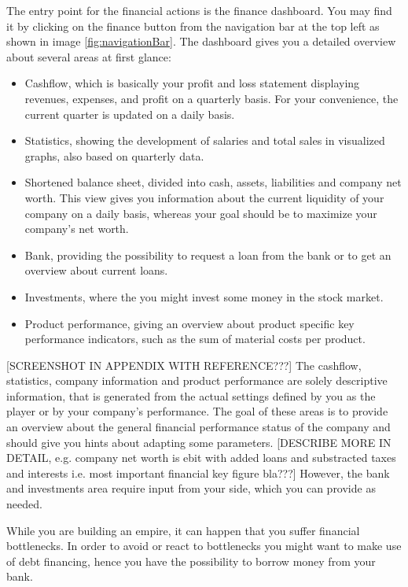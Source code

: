  The entry point for the financial actions is the finance dashboard. You may find it by clicking on the finance button from the navigation bar at the top left as shown in image \ref{fig:navigationBar}. The dashboard gives you a detailed overview about several areas at first glance:
\begin{itemize}
    \item Cashflow, which is basically your profit and loss statement displaying revenues, expenses, and profit on a quarterly basis. For your convenience, the current quarter is updated on a daily basis.
    \item Statistics, showing the development of salaries and total sales in visualized graphs, also based on quarterly data.
    \item Shortened balance sheet, divided into cash, assets, liabilities and company net worth. This view gives you information about the current liquidity of your company on a daily basis, whereas your goal should be to maximize your company's net worth.
    \item Bank, providing the possibility to request a loan from the bank or to get an overview about current loans.
    \item Investments, where the you might invest some money in the stock market.
    \item Product performance, giving an overview about product specific key performance indicators, such as the sum of material costs per product.
\end{itemize}
[SCREENSHOT IN APPENDIX WITH REFERENCE???] The cashflow, statistics, company information and product performance are solely descriptive information, that is generated from the actual settings defined by you as the player or by your company’s performance. The goal of these areas is to provide an overview about the general financial performance status of the company and should give you hints about adapting some parameters. [DESCRIBE MORE IN DETAIL, e.g. company net worth is ebit with added loans and substracted taxes and interests i.e. most important financial key figure bla???] However, the bank and investments area require input from your side, which you can provide as needed. 

While you are building an empire, it can happen that you suffer financial bottlenecks. In order to avoid or react to bottlenecks you might want to make use of debt financing, hence you have the possibility to borrow money from your bank. 

